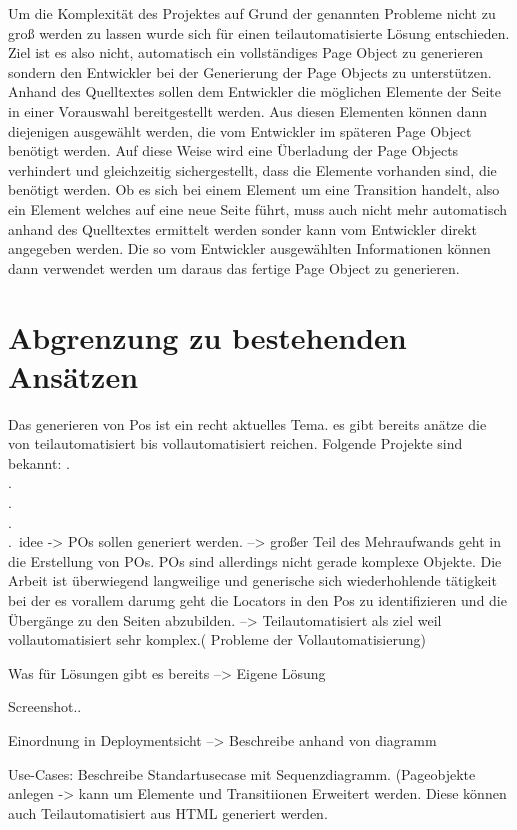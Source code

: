 Um die Komplexität des Projektes auf Grund der genannten Probleme nicht zu groß werden zu lassen wurde sich für einen teilautomatisierte Lösung entschieden.
Ziel ist es also nicht, automatisch ein vollständiges Page Object zu generieren sondern den Entwickler bei der Generierung der Page Objects zu unterstützen. Anhand des Quelltextes sollen dem Entwickler die möglichen Elemente der Seite in einer Vorauswahl bereitgestellt werden. Aus diesen Elementen können dann diejenigen ausgewählt werden, die vom Entwickler im späteren Page Object benötigt werden. Auf diese Weise wird eine Überladung der Page Objects verhindert und gleichzeitig sichergestellt, dass die Elemente vorhanden sind, die benötigt werden.
Ob es sich bei einem Element um eine Transition handelt, also ein Element welches auf eine neue Seite führt, muss auch nicht mehr automatisch anhand des Quelltextes ermittelt werden sonder kann vom Entwickler direkt angegeben werden.
Die so vom Entwickler ausgewählten Informationen können dann verwendet werden um daraus das fertige Page Object zu generieren.

\section{Abgrenzung zu bestehenden Ansätzen}
Das generieren von Pos ist ein recht aktuelles Tema. es gibt bereits anätze die von teilautomatisiert bis vollautomatisiert reichen. Folgende Projekte sind bekannt:
.\\
.\\
.\\
.\\
.\
idee -> POs sollen generiert werden.
--> großer Teil des Mehraufwands geht in die Erstellung von POs. POs sind allerdings nicht gerade komplexe Objekte. Die Arbeit ist überwiegend langweilige und generische sich wiederhohlende tätigkeit bei der es vorallem darumg geht die Locators in den Pos zu identifizieren und die Übergänge zu den Seiten abzubilden.
--> Teilautomatisiert als ziel weil vollautomatisiert sehr komplex.( Probleme der Vollautomatisierung)

Was für Lösungen gibt es bereits
--> Eigene Lösung

Screenshot..

Einordnung in Deploymentsicht
--> Beschreibe anhand von diagramm

Use-Cases: Beschreibe Standartusecase mit Sequenzdiagramm. (Pageobjekte anlegen -> kann um Elemente und Transitiionen Erweitert werden. Diese können auch Teilautomatisiert aus HTML generiert werden.

